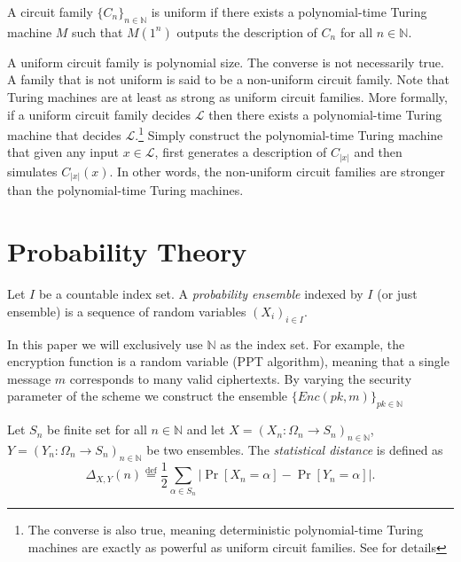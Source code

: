 \begin{definition}
A circuit family $\{C_n\}_{n \in \mathbb{N}}$ is uniform if there exists a polynomial-time Turing machine $M$ such that $M(1^n)$ outputs the description of $C_n$ for all $n\in \mathbb{N}$.
\end{definition}

A uniform circuit family is polynomial size. The converse is not necessarily true. A family that is not uniform is said to be a non-uniform circuit family. Note that Turing machines are at least as strong as uniform circuit families. More formally, if a uniform circuit family decides $\mathscr{L}$ then there exists a polynomial-time Turing machine that decides $\mathscr{L}$.\footnote{The converse is also true, meaning deterministic polynomial-time Turing machines are exactly as powerful as uniform circuit families. See \cite[pp. 111]{Arora} for details} Simply construct the polynomial-time Turing machine that given any input $x \in \mathscr{L}$, first generates a description of $C_{|x|}$ and then simulates $C_{|x|}(x)$. In other words, the non-uniform circuit families are stronger than the polynomial-time Turing machines.

\section{Probability Theory}

\begin{definition}
    Let $I$ be a countable index set. A \textit{probability ensemble} indexed by $I$ (or just ensemble) is a sequence of random variables $(X_i)_{i \in I}$.
\end{definition}

In this paper we will exclusively use $\mathbb{N}$ as the index set.
For example, the encryption function is a random variable (PPT algorithm), meaning that a single message $m$ corresponds to many valid ciphertexts. By varying the security parameter of the scheme we construct the ensemble $\{Enc(pk,m)\}_{pk \in \mathbb{N}}$

\begin{definition}
    Let $S_n$ be finite set for all $n \in \mathbb{N}$ and let $X = (X_n \colon \Omega_n \to S_n)_{n \in \mathbb{N}}$, $Y = (Y_n \colon \Omega_n \to S_n)_{n \in \mathbb{N}}$ be two ensembles. The \textit{statistical distance} is defined as
    \begin{equation*}
        \Delta_{X,Y}(n) \stackrel{\mathrm{def}}{=} \frac{1}{2} \sum_{\alpha \in S_n} |\operatorname{Pr}[X_n = \alpha] - \operatorname{Pr}[Y_n = \alpha]|.
    \end{equation*}
\end{definition}


